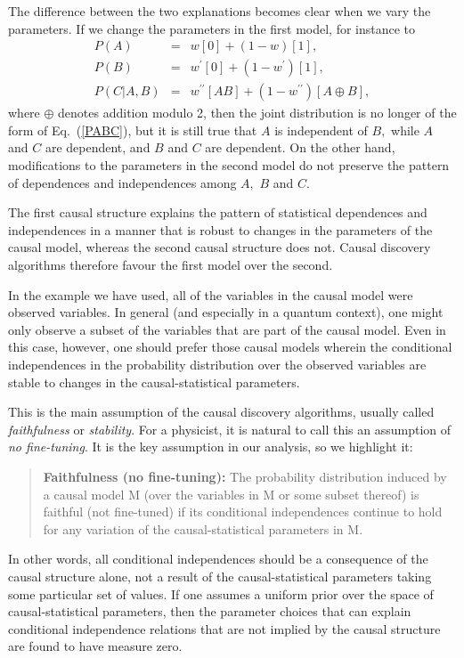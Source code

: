 \documentclass[12pt,onecolumn,nofootinbib]{revtex4-2}
\begin{document}
The difference between the two explanations becomes clear when we vary the
parameters.  If we change the parameters in the first model, for instance
to
\begin{eqnarray*}
P(A) &=&w[0]+(1-w)[1], \\
P(B) &=&w^{\prime }[0]+\left( 1-w^{\prime }\right) [1], \\
P(C|A,B) &=&w^{\prime \prime }\left[ AB\right] +(1-w^{\prime \prime })[A\oplus B],
\end{eqnarray*}
where $\oplus$ denotes addition modulo 2, then the joint distribution is no longer of the form of Eq.~(\ref{PABC}),
but it is still true that $A$ is independent of $B,$ while $A$ and $C$ are
dependent, and $B$ and $C$ are dependent. On the other hand, modifications
to the parameters in the second model do not preserve the pattern of
dependences and independences among $A,$ $B$ and $C.$

The first causal structure explains the pattern of statistical dependences
and independences in a manner that is robust to changes in the parameters of
the causal model, whereas the second causal structure does not. Causal
discovery algorithms therefore favour the first model over the second.

In the example we have used, all of the variables in the causal model were observed variables.  In general (and especially in a quantum context), one might only observe a subset of the variables that are part of the causal model. Even in this case, however, one should prefer those causal models wherein the conditional independences in the probability distribution over the observed variables are stable to changes in the causal-statistical parameters.

This is the main assumption of the causal discovery algorithms, usually
called \emph{faithfulness }\cite{Spirtes2001} or \emph{stability}\cite{Pearl2009}.   For a physicist, it is natural to call this an assumption of \emph{no fine-tuning}. \color{black}  It is the key
assumption in our analysis, so we highlight it:

\begin{quote}
\textbf{Faithfulness (no fine-tuning): }The probability distribution induced by a causal
model M (over the variables in M or some subset thereof) is faithful (not fine-tuned) if its conditional independences continue to hold for any variation of the causal-statistical parameters in M.
\end{quote}

In other words, all conditional independences should be a consequence of the causal structure alone, not a result of the causal-statistical parameters taking some particular set of values.
If one assumes a uniform prior over the space of causal-statistical parameters, then the parameter choices that can explain 
conditional independence relations that are not implied by the causal structure are found to have measure zero.
\end{document}

